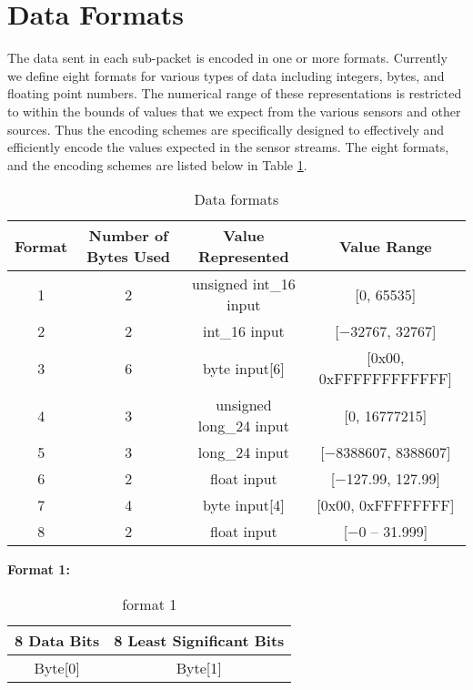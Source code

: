 \newpage
\section{Data Formats}

The data sent in each sub-packet is encoded in one or more formats. Currently
we define eight formats for various types of data including integers, bytes,
and floating point numbers. The numerical range of these representations is
restricted to within the bounds of values that we expect from the various sensors
and other sources. Thus the encoding schemes are specifically designed to
effectively and efficiently encode the values expected in the sensor streams.
The eight formats, and the encoding schemes are listed below in Table \ref{table:overall}.
\\

\begin{table}[H]
    \centering
    {
    \begin{tabular}{|c|c|c|c|}
        \hline
        \rowcolor{black!8}
        \textbf{Format} & \textbf{Number of Bytes Used} & \textbf{Value Represented} & \textbf{Value Range} \\ \hline
        1 & 2 & unsigned int\_16 input & [0, 65535] \\ \hline
        2 & 2 & int\_16 input & [$-$32767, 32767] \\ \hline
        3 & 6 & byte input[6] & [0x00, 0xFFFFFFFFFFFF] \\ \hline
        4 & 3 & unsigned long\_24 input & [0, 16777215] \\ \hline
        5 & 3 & long\_24 input & [$-$8388607, 8388607] \\ \hline
        6 & 2 & float input & [$-$127.99, 127.99] \\ \hline
        7 & 4 & byte input[4] & [0x00, 0xFFFFFFFF] \\ \hline
        8 & 2 & float input & [$-$0 -- 31.999] \\ \hline
    \end{tabular}
    }
    \caption{Data formats}
    \label{table:overall}
\end{table}


\textbf{Format 1:}
\begin{table}[H]
    \centering
    {
    \begin{tabular}{|c|c|}
        \hline
        \rowcolor{black!8}
        \textbf{8 Data Bits} & \textbf{8 Least Significant Bits} \\ \hline
        Byte[0] & Byte[1] \\ \hline
    \end{tabular}
    }
    \caption{format 1}
    \label{table:format1}
\end{table}


